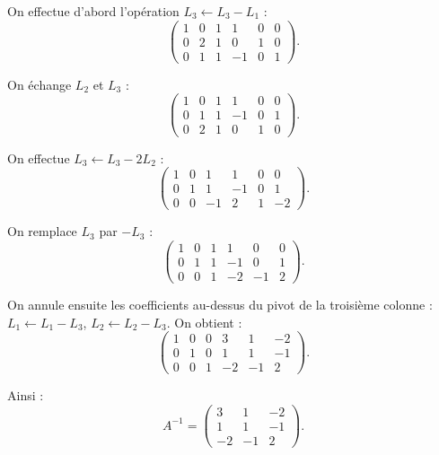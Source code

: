 {\begin{enumerate}
{			On effectue d'abord l'opération $L_3 \leftarrow L_3-L_1$ :
			\[
			\left(
			\begin{array}{ccc|ccc}
				1&0&1&1&0&0\\
				0&2&1&0&1&0\\
				0&1&1&-1&0&1
			\end{array}
			\right).
			\]
			
			On échange $L_2$ et $L_3$ :
			\[
			\left(
			\begin{array}{ccc|ccc}
				1&0&1&1&0&0\\
				0&1&1&-1&0&1\\
				0&2&1&0&1&0
			\end{array}
			\right).
			\]
			
			On effectue $L_3 \leftarrow L_3-2L_2$ :
			\[
			\left(
			\begin{array}{ccc|ccc}
				1&0&1&1&0&0\\
				0&1&1&-1&0&1\\
				0&0&-1&2&1&-2
			\end{array}
			\right).
			\]
			
			On remplace $L_3$ par $-L_3$ :
			\[
			\left(
			\begin{array}{ccc|ccc}
				1&0&1&1&0&0\\
				0&1&1&-1&0&1\\
				0&0&1&-2&-1&2
			\end{array}
			\right).
			\]
			
			On annule ensuite les coefficients au-dessus du pivot de la troisième colonne :
			$L_1 \leftarrow L_1-L_3$, $L_2 \leftarrow L_2-L_3$. On obtient :
			\[
			\left(
			\begin{array}{ccc|ccc}
				1&0&0&3&1&-2\\
				0&1&0&1&1&-1\\
				0&0&1&-2&-1&2
			\end{array}
			\right).
			\]
			
			Ainsi :
			\[
			A^{-1}
			=
			\begin{pmatrix}
				3&1&-2\\
				1&1&-1\\
				-2&-1&2
			\end{pmatrix}.
			\]
		}
		

\end{enumerate}}
